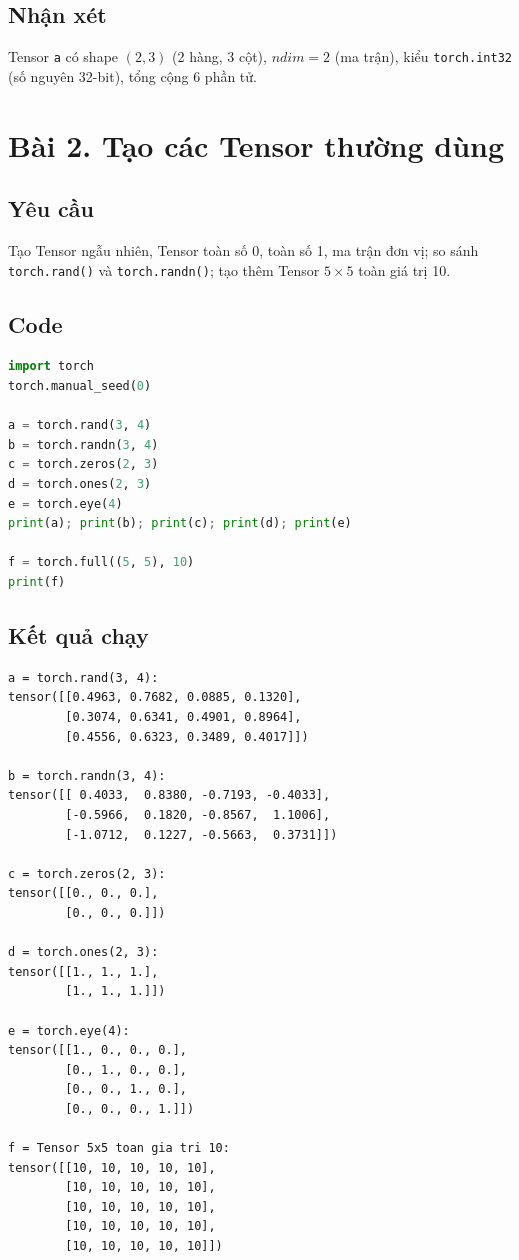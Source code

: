 \documentclass[a4paper,13pt]{article}
\begin{document}
\subsection{Nhận xét}
Tensor \texttt{a} có shape $(2,3)$ (2 hàng, 3 cột), $ndim=2$ (ma trận), kiểu \texttt{torch.int32} (số nguyên 32-bit), tổng cộng 6 phần tử.

\newpage
\section{Bài 2. Tạo các Tensor thường dùng}

\subsection{Yêu cầu}
Tạo Tensor ngẫu nhiên, Tensor toàn số 0, toàn số 1, ma trận đơn vị; so sánh \texttt{torch.rand()} và \texttt{torch.randn()}; tạo thêm Tensor $5 \times 5$ toàn giá trị 10.

\subsection{Code}
\begin{lstlisting}[language=Python]
import torch
torch.manual_seed(0)

a = torch.rand(3, 4)
b = torch.randn(3, 4)
c = torch.zeros(2, 3)
d = torch.ones(2, 3)
e = torch.eye(4)
print(a); print(b); print(c); print(d); print(e)

f = torch.full((5, 5), 10)
print(f)
\end{lstlisting}

\subsection{Kết quả chạy}
\begin{lstlisting}[backgroundcolor=\color{outgray}]
a = torch.rand(3, 4):
tensor([[0.4963, 0.7682, 0.0885, 0.1320],
        [0.3074, 0.6341, 0.4901, 0.8964],
        [0.4556, 0.6323, 0.3489, 0.4017]])

b = torch.randn(3, 4):
tensor([[ 0.4033,  0.8380, -0.7193, -0.4033],
        [-0.5966,  0.1820, -0.8567,  1.1006],
        [-1.0712,  0.1227, -0.5663,  0.3731]])

c = torch.zeros(2, 3):
tensor([[0., 0., 0.],
        [0., 0., 0.]])

d = torch.ones(2, 3):
tensor([[1., 1., 1.],
        [1., 1., 1.]])

e = torch.eye(4):
tensor([[1., 0., 0., 0.],
        [0., 1., 0., 0.],
        [0., 0., 1., 0.],
        [0., 0., 0., 1.]])

f = Tensor 5x5 toan gia tri 10:
tensor([[10, 10, 10, 10, 10],
        [10, 10, 10, 10, 10],
        [10, 10, 10, 10, 10],
        [10, 10, 10, 10, 10],
        [10, 10, 10, 10, 10]])
\end{lstlisting}
\end{document}
